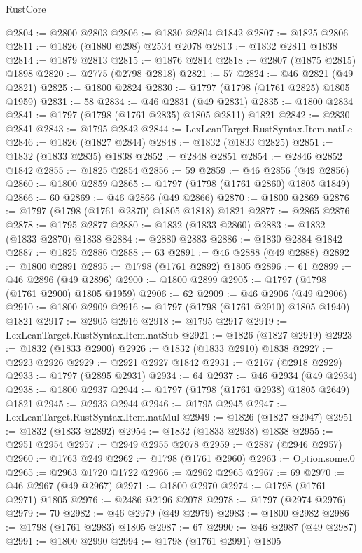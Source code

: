 \begin{lexlean}{RustCore}
\begin{coremodule}
@2804 := @2800 @2803
@2806 := @1830 @2804 @1842
@2807 := @1825 @2806
@2811 := @1826 (@1880 @298) @2534 @2078
@2813 := @1832 @2811 @1838
@2814 := @1879 @2813
@2815 := @1876 @2814
@2818 := @2807 (@1875 @2815) @1898
@2820 := @2775 (@2798 @2818)
@2821 := 57
@2824 := @46 @2821 (@49 @2821)
@2825 := @1800 @2824
@2830 := @1797 (@1798 (@1761 @2825) @1805 @1959)
@2831 := 58
@2834 := @46 @2831 (@49 @2831)
@2835 := @1800 @2834
@2841 := @1797 (@1798 (@1761 @2835) @1805 @2811) @1821
@2842 := @2830 @2841
@2843 := @1795 @2842
@2844 := LexLeanTarget.RustSyntax.Item.natLe
@2846 := @1826 (@1827 @2844)
@2848 := @1832 (@1833 @2825)
@2851 := @1832 (@1833 @2835) @1838
@2852 := @2848 @2851
@2854 := @2846 @2852 @1842
@2855 := @1825 @2854
@2856 := 59
@2859 := @46 @2856 (@49 @2856)
@2860 := @1800 @2859
@2865 := @1797 (@1798 (@1761 @2860) @1805 @1849)
@2866 := 60
@2869 := @46 @2866 (@49 @2866)
@2870 := @1800 @2869
@2876 := @1797 (@1798 (@1761 @2870) @1805 @1818) @1821
@2877 := @2865 @2876
@2878 := @1795 @2877
@2880 := @1832 (@1833 @2860)
@2883 := @1832 (@1833 @2870) @1838
@2884 := @2880 @2883
@2886 := @1830 @2884 @1842
@2887 := @1825 @2886
@2888 := 63
@2891 := @46 @2888 (@49 @2888)
@2892 := @1800 @2891
@2895 := @1798 (@1761 @2892) @1805
@2896 := 61
@2899 := @46 @2896 (@49 @2896)
@2900 := @1800 @2899
@2905 := @1797 (@1798 (@1761 @2900) @1805 @1959)
@2906 := 62
@2909 := @46 @2906 (@49 @2906)
@2910 := @1800 @2909
@2916 := @1797 (@1798 (@1761 @2910) @1805 @1940) @1821
@2917 := @2905 @2916
@2918 := @1795 @2917
@2919 := LexLeanTarget.RustSyntax.Item.natSub
@2921 := @1826 (@1827 @2919)
@2923 := @1832 (@1833 @2900)
@2926 := @1832 (@1833 @2910) @1838
@2927 := @2923 @2926
@2929 := @2921 @2927 @1842
@2931 := @2167 (@2918 @2929)
@2933 := @1797 (@2895 @2931)
@2934 := 64
@2937 := @46 @2934 (@49 @2934)
@2938 := @1800 @2937
@2944 := @1797 (@1798 (@1761 @2938) @1805 @2649) @1821
@2945 := @2933 @2944
@2946 := @1795 @2945
@2947 := LexLeanTarget.RustSyntax.Item.natMul
@2949 := @1826 (@1827 @2947)
@2951 := @1832 (@1833 @2892)
@2954 := @1832 (@1833 @2938) @1838
@2955 := @2951 @2954
@2957 := @2949 @2955 @2078
@2959 := @2887 (@2946 @2957)
@2960 := @1763 @249
@2962 := @1798 (@1761 @2960)
@2963 := Option.some.{0}
@2965 := @2963 @1720 @1722
@2966 := @2962 @2965
@2967 := 69
@2970 := @46 @2967 (@49 @2967)
@2971 := @1800 @2970
@2974 := @1798 (@1761 @2971) @1805
@2976 := @2486 @2196 @2078
@2978 := @1797 (@2974 @2976)
@2979 := 70
@2982 := @46 @2979 (@49 @2979)
@2983 := @1800 @2982
@2986 := @1798 (@1761 @2983) @1805
@2987 := 67
@2990 := @46 @2987 (@49 @2987)
@2991 := @1800 @2990
@2994 := @1798 (@1761 @2991) @1805

\end{coremodule}
\end{lexlean}
